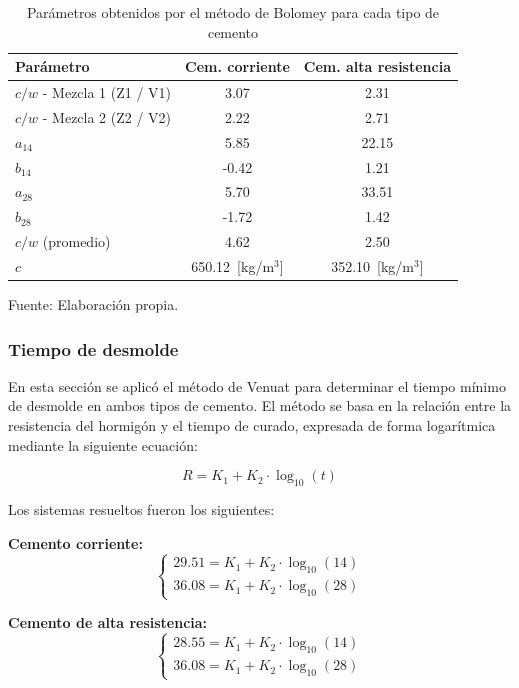 \begin{table}[H]
\centering
\renewcommand{\arraystretch}{1.15}
\caption{Parámetros obtenidos por el método de Bolomey para cada tipo de cemento}
\small
\begin{tabular}{lcc}
\hline
\textbf{Parámetro} & \textbf{Cem. corriente} & \textbf{Cem. alta resistencia} \\ \hline
$c/w$ - Mezcla 1 (Z1 / V1) & 3.07 & 2.31 \\
$c/w$ - Mezcla 2 (Z2 / V2) & 2.22 & 2.71 \\
$a_{14}$ & 5.85 & 22.15 \\
$b_{14}$ & -0.42 & 1.21 \\
$a_{28}$ & 5.70 & 33.51 \\
$b_{28}$ & -1.72 & 1.42 \\
$c/w$ (promedio) & 4.62 & 2.50 \\
$c$ & 650.12~[kg/m$^3$] & 352.10~[kg/m$^3$] \\ \hline
\end{tabular}
\begin{center}
Fuente: Elaboración propia.
\end{center}
\end{table}

\subsubsection*{Tiempo de desmolde}

En esta sección se aplicó el método de Venuat para determinar el tiempo mínimo de desmolde en ambos tipos de cemento.  
El método se basa en la relación entre la resistencia del hormigón y el tiempo de curado, expresada de forma logarítmica mediante la siguiente ecuación:

\[
R = K_1 + K_2 \cdot \log_{10}(t)
\]

Los sistemas resueltos fueron los siguientes:

\textbf{Cemento corriente:}
\[
\begin{cases}
29.51 = K_1 + K_2 \cdot \log_{10}(14) \\
36.08 = K_1 + K_2 \cdot \log_{10}(28)
\end{cases}
\]

\textbf{Cemento de alta resistencia:}
\[
\begin{cases}
28.55 = K_1 + K_2 \cdot \log_{10}(14) \\
36.08 = K_1 + K_2 \cdot \log_{10}(28)
\end{cases}
\]

